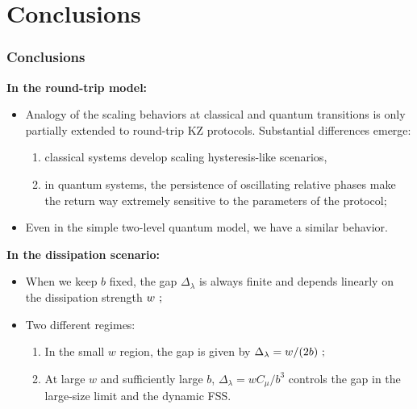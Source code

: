 \section{Conclusions}

\begin{frame}
	\frametitle{Conclusions}
	{\bf In the round-trip model:}
	\begin{itemize}
      	\item
      		Analogy of the scaling behaviors at classical and quantum transitions 
      		is only partially extended to round-trip KZ protocols. 
      		Substantial differences emerge:
      		\begin{enumerate} 
      			\item
      				classical systems develop scaling hysteresis-like scenarios, 
      			\item
      				in quantum systems, the persistence of oscillating relative 
      				phases make the return way extremely sensitive to the 
      				parameters of the protocol;
		\end{enumerate}
		
      	\medskip
      	\medskip

      	\item
      		Even in the simple two-level quantum model, we have a similar 
      		behavior.
      \end{itemize}
      
      \medskip
      \medskip
      \medskip
      
      {\bf In the dissipation scenario:}
      \begin{itemize}
      	\item
      		When we keep $b$ fixed, the gap $\Delta_\lambda$ is always finite
      		 and depends linearly on the dissipation strength $w \,\, ;$ 
      	\medskip
      	\medskip
      	\item 			
      		 Two different regimes: 
      		 \begin{enumerate}
      		 	\item In the small $w$ region, the gap is given by 
      		 	$\Delta_\lambda = w/(2b) \,\, ;$

			\item At large $w$ and sufficiently large $b$,
			$\Delta_\lambda = wC_\mu /b^3$ controls the gap
			in the large-size limit and the dynamic FSS.
		\end{enumerate}

      \end{itemize}

\end{frame}
